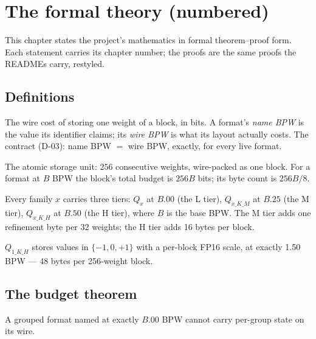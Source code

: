\chapter{The formal theory (numbered)}

This chapter states the project's mathematics in formal theorem--proof form. Each statement
carries its chapter number; the proofs are the same proofs the READMEs carry, restyled.

\section{Definitions}

\begin{definition}\label{def:bpw}
The wire cost of storing one weight of a block, in bits. A format's \emph{name BPW} is the
value its identifier claims; its \emph{wire BPW} is what its layout actually costs. The
contract (D-03): name BPW $=$ wire BPW, exactly, for every live format.
\end{definition}

\begin{definition}\label{def:block}
The atomic storage unit: $256$ consecutive weights, wire-packed as one block. For a format at
$B$ BPW the block's total budget is $256B$ bits; its byte count is $256B/8$.
\end{definition}

\begin{definition}\label{def:tiers}
Every family $x$ carries three tiers: $Q_x$ at $B.00$ (the L tier), $Q_{x\_K\_M}$ at $B.25$
(the M tier), $Q_{x\_K\_H}$ at $B.50$ (the H tier), where $B$ is the base BPW. The M tier adds
one refinement byte per 32 weights; the H tier adds 16 bytes per block.
\end{definition}

\begin{definition}\label{def:ternary}
$Q_{1\_K\_H}$ stores values in $\{-1, 0, +1\}$ with a per-block FP16 scale, at exactly 1.50
BPW --- 48 bytes per 256-weight block.
\end{definition}

\section{The budget theorem}

\begin{theorem}\label{thm:budget}
A grouped format named at exactly $B.00$ BPW cannot carry per-group state on its wire.
\end{theorem}

